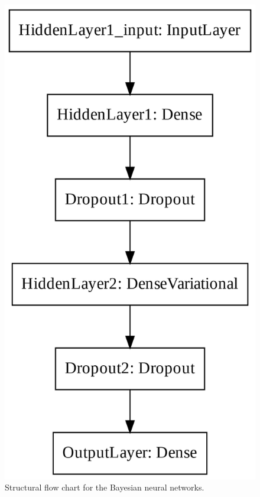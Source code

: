 \begin{figure}[!htp]
\centering
\begin{minipage}[b][][b]{.35\linewidth}
    \includegraphics[width=\linewidth]{templates/images/Figure-TF_BNN_Structure.png}
    \caption[Bayesian neural network structural flow]{Structural flow chart for the Bayesian neural networks.}
    \label{fig:bnn_text_structure}

\end{minipage}
\end{figure}
